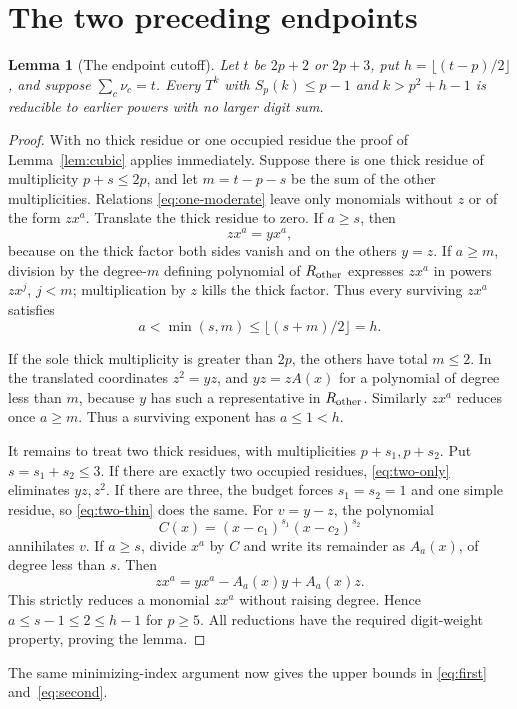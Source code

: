\documentclass[11pt]{article}
\newtheorem{lemma}[theorem]{Lemma}
\theoremstyle{remark}\newtheorem{remark}[theorem]{Remark}
\begin{document}
\section{The two preceding endpoints}
\begin{lemma}[The endpoint cutoff]\label{lem:endpoint}
Let $t$ be $2p+2$ or $2p+3$, put $h=\lfloor(t-p)/2\rfloor$, and suppose $\sum_c\nu_c=t$. Every $T^k$ with $S_p(k)\le p-1$ and $k>p^2+h-1$ is reducible to earlier powers with no larger digit sum.
\end{lemma}
\begin{proof}
With no thick residue or one occupied residue the proof of Lemma~\ref{lem:cubic} applies immediately. Suppose there is one thick residue of multiplicity $p+s\le2p$, and let $m=t-p-s$ be the sum of the other multiplicities. Relations \eqref{eq:one-moderate} leave only monomials without $z$ or of the form $zx^a$. Translate the thick residue to zero. If $a\ge s$, then
\[
 zx^a=yx^a,
\]
because on the thick factor both sides vanish and on the others $y=z$. If $a\ge m$, division by the degree-$m$ defining polynomial of $R_{\rm other}$ expresses $zx^a$ in powers $zx^j$, $j<m$; multiplication by $z$ kills the thick factor. Thus every surviving $zx^a$ satisfies
\[
 a<\min(s,m)\le\lfloor(s+m)/2\rfloor=h.
\]

If the sole thick multiplicity is greater than $2p$, the others have total $m\le2$. In the translated coordinates $z^2=yz$, and $yz=zA(x)$ for a polynomial of degree less than $m$, because $y$ has such a representative in $R_{\rm other}$. Similarly $zx^a$ reduces once $a\ge m$. Thus a surviving exponent has $a\le1<h$.

It remains to treat two thick residues, with multiplicities $p+s_1,p+s_2$. Put $s=s_1+s_2\le3$. If there are exactly two occupied residues, \eqref{eq:two-only} eliminates $yz,z^2$. If there are three, the budget forces $s_1=s_2=1$ and one simple residue, so \eqref{eq:two-thin} does the same. For $v=y-z$, the polynomial
\[
 C(x)=(x-c_1)^{s_1}(x-c_2)^{s_2}
\]
annihilates $v$. If $a\ge s$, divide $x^a$ by $C$ and write its remainder as $A_a(x)$, of degree less than $s$. Then
\[
 zx^a=yx^a-A_a(x)y+A_a(x)z.
\]
This strictly reduces a monomial $zx^a$ without raising degree. Hence $a\le s-1\le2\le h-1$ for $p\ge5$. All reductions have the required digit-weight property, proving the lemma.
\end{proof}
The same minimizing-index argument now gives the upper bounds in \eqref{eq:first} and~\eqref{eq:second}.
\end{document}
